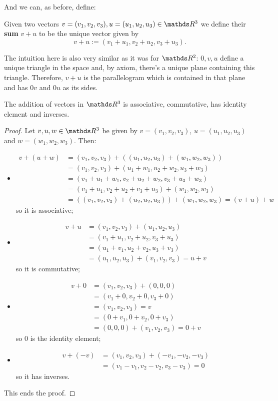 And we can, as before, define:

\begin{df}
	Given two vectors $v=(v_1,v_2,v_3),u=(u_1,u_2,u_3)\in \R^3$ we define their \textbf{sum} $v+u$ to be the unique vector given by
	\[v+u:=(v_1+u_1,v_2+u_2,v_3+u_3).\]
\end{df}

The intuition here is also very similar as it was for $\R^2$: $0,v,u$ define a unique triangle in the space and, by axiom, there's a unique plane containing this triangle. Therefore, $v+u$ is the parallelogram which is contained in that plane and has $0v$ and $0u$ as its sides.

\begin{prop}
	The addition of vectors in $\R^3$ is associative, commutative, has identity element and inverses.
\end{prop}
\begin{proof}
	Let $v,u,w\in \R^3$ be given by $v=(v_1,v_2,v_3)$, $u=(u_1,u_2,u_3)$ and $w=(w_1,w_2,w_3)$. Then:
	
	\begin{itemize}
		\item \begin{align*}
			v+(u+w)&=(v_1,v_2,v_3)+((u_1,u_2,u_3)+(w_1,w_2,w_3))\\
			&=(v_1,v_2,v_3)+(u_1+w_1,u_2+w_2,u_3+w_3)\\
			&=(v_1+u_1+w_1,v_2+u_2+w_2,v_3+u_3+w_3)\\
			&=(v_1+u_1,v_2+u_2+v_3+u_3)+(w_1,w_2,w_3)\\
			&=((v_1,v_2,v_3)+(u_2,u_2,u_3))+(w_1,w_2,w_3)=(v+u)+w
		\end{align*} so it is associative;
		
		\item \begin{align*}
			v+u&=(v_1,v_2,v_3)+(u_1,u_2,u_3)\\
			&=(v_1+u_1,v_2+u_2,v_3+u_3)\\
			&=(u_1+v_1,u_2+v_2,u_3+v_3)\\
			&=(u_1,u_2,u_3)+(v_1,v_2,v_3)=u+v
		\end{align*}so it is commutative;
		
		\item  \begin{align*}
			v+0&=(v_1,v_2,v_3)+(0,0,0)\\
			&=(v_1+0,v_2+0,v_3+0)\\
			&=(v_1,v_2,v_3)=v\\
			&=(0+v_1,0+v_2,0+v_3)\\
			&=(0,0,0)+(v_1,v_2,v_3)=0+v
		\end{align*}so $0$ is the identity element;
		
		\item \begin{align*}
			v+(-v)&=(v_1,v_2,v_3)+(-v_1,-v_2,-v_3)\\
			&=(v_1-v_1,v_2-v_2,v_3-v_3)=0
		\end{align*}so it has inverses.
	\end{itemize}

This ends the proof.
\end{proof}

